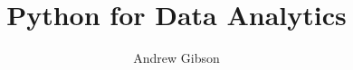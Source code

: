 \documentclass{layout/qut-report}
\begin{document}
\frontmatter

\title{Python for Data Analytics}
\author{Andrew Gibson}



\makecover

%

%

%

\renewcommand{\baselinestretch}{1.3}\normalsize %
\tableofcontents
\renewcommand{\baselinestretch}{1.0}\normalsize
%
\renewcommand{\baselinestretch}{1.0}\normalsize
\mainmatter

%



















%
\end{document}
